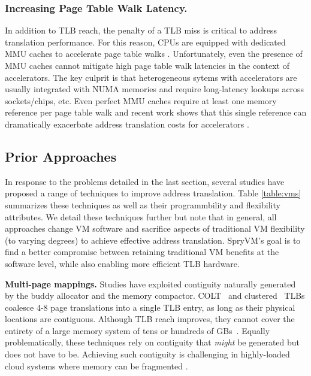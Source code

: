 \subsubsection{Increasing Page Table Walk Latency.} 
In addition to TLB reach, the penalty of a TLB miss is critical to
address translation performance. For this reason, CPUs are equipped
with dedicated MMU caches to accelerate page table walks
\cite{bhattacharjee:large-reach, barr:translation}. Unfortunately,
even the presence of MMU caches cannot mitigate high page table walk
latencies in the context of accelerators. The key culprit is that
heterogeneous sytems with accelerators are usually integrated with
NUMA memories and require long-latency lookups across sockets/chips,
etc. Even perfect MMU caches require at least one memory reference per
page table walk and recent work shows that this single reference can
dramatically exacerbate address translation costs for accelerators
\cite{picorel:near-memory, pichai:architectural}.


\subsection{Prior Approaches}

In response to the problems detailed in the last section, several
studies have proposed a range of techniques to improve address
translation. Table \ref{table:vms} summarizes these techniques as well
as their programmbility and flexibility attributes. We detail these
techniques further but note that in general, all approaches change VM
software and sacrifice aspects of traditional VM flexibility (to
varying degrees) to achieve effective address translation. SpryVM's
goal is to find a better compromise between retaining traditional VM
benefits at the software level, while also enabling more efficient TLB
hardware.

\vspace{2mm}
\noindent\textbf{Multi-page mappings.} Studies have exploited
contiguity naturally generated by the buddy allocator and the memory
compactor. COLT~\cite{pham:colt} and clustered~\cite{pham:increasing}
TLBs coalesce 4-8 page translations into a single TLB entry, as long
as their physical locations are contiguous. Although TLB reach
improves, they cannot cover the entirety of a large memory system of
tens or hundreds of GBs~\cite{gandhi:range}.  Equally problematically,
these techniques rely on contiguity that {\it might} be generated but
does not have to be. Achieving such contiguity is challenging in
highly-loaded cloud systems where memory can be fragmented
\cite{pham:colt}.


